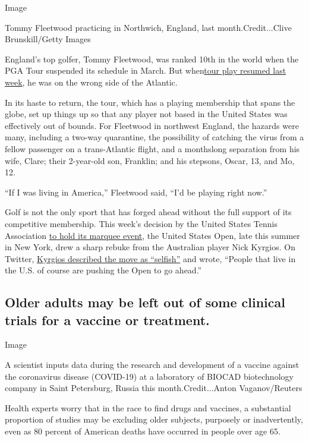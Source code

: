 Image

Tommy Fleetwood practicing in Northwich, England, last
month.Credit...Clive Brunskill/Getty Images

England's top golfer, Tommy Fleetwood, was ranked 10th in the world when
the PGA Tour suspended its schedule in March. But
when\href{https://www.nytimes.com/2020/06/11/sports/golf/pga-tour-charles-schwab.html}{tour
play resumed last week}, he was on the wrong side of the Atlantic.

In its haste to return, the tour, which has a playing membership that
spans the globe, set up things up so that any player not based in the
United States was effectively out of bounds. For Fleetwood in northwest
England, the hazards were many, including a two-way quarantine, the
possibility of catching the virus from a fellow passenger on a
trans-Atlantic flight, and a monthslong separation from his wife, Clare;
their 2-year-old son, Franklin; and his stepsons, Oscar, 13, and Mo, 12.

``If I was living in America,'' Fleetwood said, ``I'd be playing right
now.''

Golf is not the only sport that has forged ahead without the full
support of its competitive membership. This week's decision by the
United States Tennis Association
\href{https://www.nytimes.com/2020/06/15/sports/tennis/us-open.html}{to
hold its marquee event}, the United States Open, late this summer in New
York, drew a sharp rebuke from the Australian player Nick Kyrgios. On
Twitter,
\href{https://twitter.com/NickKyrgios/status/1272687984882577408?s=20}{Kyrgios
described the move as ``selfish''} and wrote, ``People that live in the
U.S. of course are pushing the Open to go ahead.''

\hypertarget{older-adults-may-be-left-out-of-some-clinical-trials-for-a-vaccine-or-treatment}{%
\subsection{Older adults may be left out of some clinical trials for a
vaccine or
treatment.}\label{older-adults-may-be-left-out-of-some-clinical-trials-for-a-vaccine-or-treatment}}

Image

A scientist inputs data during the research and development of a vaccine
against the coronavirus disease (COVID-19) at a laboratory of BIOCAD
biotechnology company in Saint Petersburg, Russia this
month.Credit...Anton Vaganov/Reuters

Health experts worry that in the race to find drugs and vaccines, a
substantial proportion of studies may be excluding older subjects,
purposely or inadvertently, even as 80 percent of American deaths have
occurred in people over age 65.

